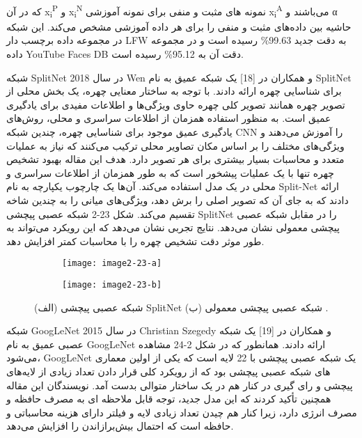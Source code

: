 که در آن
x\textsubscript{i}\textsuperscript{P}   
و
x\textsubscript{i}\textsuperscript{N}   
نمونه های مثبت و منفی برای نمونه آموزشی
x\textsubscript{i}\textsuperscript{A}
می‌باشند و α حاشیه بین داده‌های مثبت و منفی را برای هر داده آموزشی مشخص می‌کند. این شبکه در مجموعه داده برچسب دار LFW به دقت جدید 99.63\% رسیده است و در مجموعه داده YouTube Faces DB دقت آن به 95.12\% رسیده است.
	
	شبکه SplitNet
در سال 2018 Wen و همکاران در [18] یک شبکه عمیق به نام SplitNet برای شناسایی چهره ارائه دادند. با توجه به ساختار معنایی چهره، یک بخش محلی از تصویر چهره همانند تصویر کلی چهره حاوی ویژگی‌ها و اطلاعات مفیدی برای یادگیری عمیق است. به منظور استفاده همزمان از اطلاعات سراسری و محلی، روش‌های یادگیری عمیق موجود برای شناسایی چهره، چندین شبکه CNN را آموزش می‌دهند و ویژگی‌های مختلف را بر اساس مکان تصاویر محلی ترکیب می‌کنند که نیاز به عملیات متعدد و محاسبات بسیار بیشتری برای هر تصویر دارد. هدف این مقاله بهبود تشخیص چهره تنها با یک عملیات پیشخور  است که به طور همزمان از اطلاعات سراسری و محلی در یک مدل استفاده می‌کند. آن‌ها یک چارچوب یکپارچه به نام Split-Net ارائه دادند که به جای آن که تصویر اصلی را برش دهد، ویژگی‌های میانی را به چندین شاخه تقسیم می‌کند. شکل ‏2-23 شبکه عصبی پیچشی SplitNet را در مقابل شبکه عصبی پیچشی معمولی نشان می‌دهد. نتایج تجربی نشان می‌دهد که این رویکرد می‌تواند به طور موثر دقت تشخیص چهره را با محاسبات کمتر افزایش دهد. 
 	 
\begin{figure}
\begin{subfigure}{.5\textwidth}
  \centering
  \texttt{[image: image2-23-a]}
  \label{image2-23-a}
\end{subfigure}
\begin{subfigure}{.5\textwidth}
  \centering
  \texttt{[image: image2-23-b]}
  \label{image2-23-b}
\end{subfigure}
  \caption{ (الف) شبکه عصبی پیچشی SplitNet  (ب) شبکه عصبی پیچشی معمولی \cite{ref1}.}
\label{fig:image2-23}
\end{figure}

	شبکه GoogLeNet
در سال 2015 Christian Szegedy و همکاران در [19] یک شبکه عصبی عمیق به نام GoogLeNet ارائه دادند. همانطور که در شکل 2-24 مشاهده می‌شود، GoogLeNet یک شبکه عصبی پیچشی با 22 لایه است که یکی از اولین معماری های شبکه عصبی پیچشی بود که از رویکرد کلی قرار دادن تعداد زیادی از لایه‌های پیچشی و رای گیری  در کنار هم در یک ساختار متوالی بدست آمد. نویسندگان این مقاله همچنین تأکید کردند که این مدل جدید، توجه قابل ملاحظه ای به مصرف حافظه و مصرف انرژی دارد، زیرا کنار هم چیدن تعداد زیادی لایه و فیلتر دارای هزینه محاسباتی و حافظه است که احتمال بيش‌برازاندن  را افزایش می‌دهد.
 

